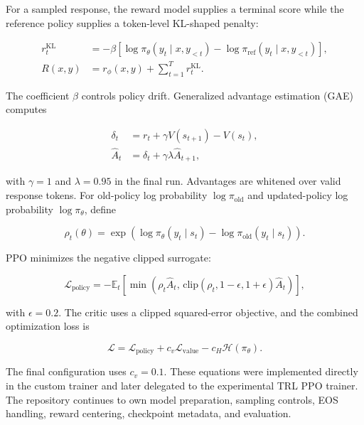\documentclass[11pt]{article}
\newcommand{\trl}{\textsc{TRL}}
\begin{document}
For a sampled response, the reward model supplies a terminal score while the
reference policy supplies a token-level KL-shaped penalty:

\begin{align}
r_t^{\mathrm{KL}}
&=
-\beta\left[
\log \pi_\theta(y_t\mid x,y_{<t})
-
\log \pi_{\mathrm{ref}}(y_t\mid x,y_{<t})
\right],\\
R(x,y)
&=
r_\phi(x,y) + \sum_{t=1}^{T}r_t^{\mathrm{KL}}.
\label{eq:rlhf-reward}
\end{align}

The coefficient $\beta$ controls policy drift. Generalized advantage
estimation (GAE) computes

\begin{align}
\delta_t &= r_t + \gamma V(s_{t+1}) - V(s_t),\\
\hat{A}_t &= \delta_t + \gamma\lambda \hat{A}_{t+1},
\end{align}

with $\gamma=1$ and $\lambda=0.95$ in the final run. Advantages are whitened
over valid response tokens. For old-policy log probability
$\log\pi_{\mathrm{old}}$ and updated-policy log probability
$\log\pi_\theta$, define

\begin{equation}
\rho_t(\theta)
=
\exp\left(
\log\pi_\theta(y_t\mid s_t)
-
\log\pi_{\mathrm{old}}(y_t\mid s_t)
\right).
\end{equation}

PPO minimizes the negative clipped surrogate:

\begin{equation}
\mathcal{L}_{\mathrm{policy}}
=
-\mathbb{E}_t\left[
\min\left(
\rho_t\hat{A}_t,\,
\mathrm{clip}(\rho_t,1-\epsilon,1+\epsilon)\hat{A}_t
\right)
\right],
\label{eq:ppo}
\end{equation}

with $\epsilon=0.2$. The critic uses a clipped squared-error objective, and the
combined optimization loss is

\begin{equation}
\mathcal{L}
=
\mathcal{L}_{\mathrm{policy}}
+
c_v\mathcal{L}_{\mathrm{value}}
-
c_H\mathcal{H}(\pi_\theta).
\end{equation}

The final configuration uses $c_v=0.1$. These equations were implemented
directly in the custom trainer and later delegated to the experimental
\trl{} PPO trainer. The repository continues to own model preparation,
sampling controls, EOS handling, reward centering, checkpoint metadata, and
evaluation.
\end{document}

